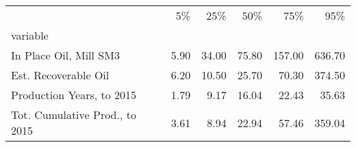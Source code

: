 \begin{tabular}{lrrrrr}
\toprule
{} &    5\% &    25\% &    50\% &     75\% &     95\% \\
variable                       &       &        &        &         &         \\
\midrule
In Place Oil, Mill SM3         &  5.90 &  34.00 &  75.80 &  157.00 &  636.70 \\
Est. Recoverable Oil           &  6.20 &  10.50 &  25.70 &   70.30 &  374.50 \\
Production Years, to 2015      &  1.79 &   9.17 &  16.04 &   22.43 &   35.63 \\
Tot. Cumulative Prod., to 2015 &  3.61 &   8.94 &  22.94 &   57.46 &  359.04 \\
\bottomrule
\end{tabular}

